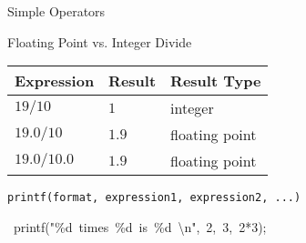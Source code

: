 \begin{frame}{Simple Operators}
\begin{center}
\end{center}
\end{frame}

\begin{frame}{Floating Point vs. Integer Divide}
  \begin{center}
    \begin{tabular}{lll}\hline
      \textbf{Expression}&\textbf{Result}&\textbf{Result Type}\\\hline
      $19/10$&$1$&integer\\
      $19.0/10$&$1.9$&floating point\\
      $19.0/10.0$&$1.9$&floating point\\\hline
    \end{tabular}
  \end{center}
\end{frame}

\begin{frame}{\texttt{printf(format, expression1, expression2, ...)}}
  \begin{center}{\Large
      \mbox{{\ttfamily
          printf("\%d times \%d is \%d \textbackslash n", 2, 3, 2*3);}}}
  \end{center}
\end{frame}


